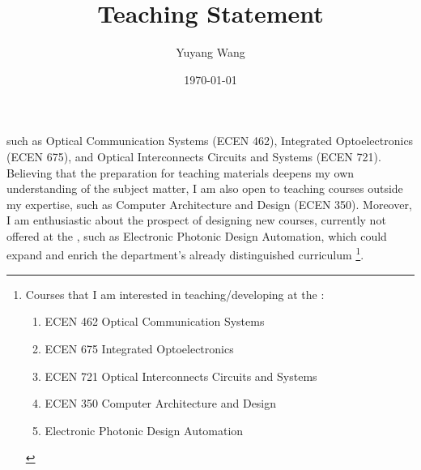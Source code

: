 



\title{Teaching Statement}

\def\courseOneName{Optical Communication Systems}
\def\courseOneNumber{ECEN 462}
\def\courseTwoName{Integrated Optoelectronics}
\def\courseTwoNumber{ECEN 675}
\def\courseThreeName{Optical Interconnects Circuits and Systems}
\def\courseThreeNumber{ECEN 721}
\def\courseFourName{Computer Architecture and Design}
\def\courseFourNumber{ECEN 350}
\def\courseSixName{Electronic Photonic Design Automation}

\def\rsCustom{%
such as \courseOneName{} (\courseOneNumber{}), \courseTwoName{} (\courseTwoNumber{}), and \courseThreeName{} (\courseThreeNumber{}). Believing that the preparation for teaching materials deepens my own understanding of the subject matter, I am also open to teaching courses outside my expertise, such as \courseFourName{} (\courseFourNumber{}). Moreover, I am enthusiastic about the prospect of designing new courses, currently not offered at the \appSchool{}, such as \courseSixName{}, which could expand and enrich the department's already distinguished curriculum%
\footnote{%
Courses that I am interested in teaching/developing at the \appDept{}:
\begin{enumerate}
    \item \courseOneNumber{} \courseOneName{}
    \item \courseTwoNumber{} \courseTwoName{}
    \item \courseThreeNumber{} \courseThreeName{}
    \item \courseFourNumber{} \courseFourName{}
    \item \courseSixName{}
\end{enumerate}
}.
}

\author{Yuyang Wang}
\date{\today}
\makeatletter
\fancyfoot[L]{\scshape \MakeLowercase{\@author}}
\fancyfoot[R]{{\scshape \MakeLowercase{\@title}}\quad{\fontsize{16}{20}\selectfont\sfrac{\thepage}{\pageref*{LastPage}}}\hspace{0.25in}}
\makeatother



\maketitle%


\rsCustom{}


\footnotesize



